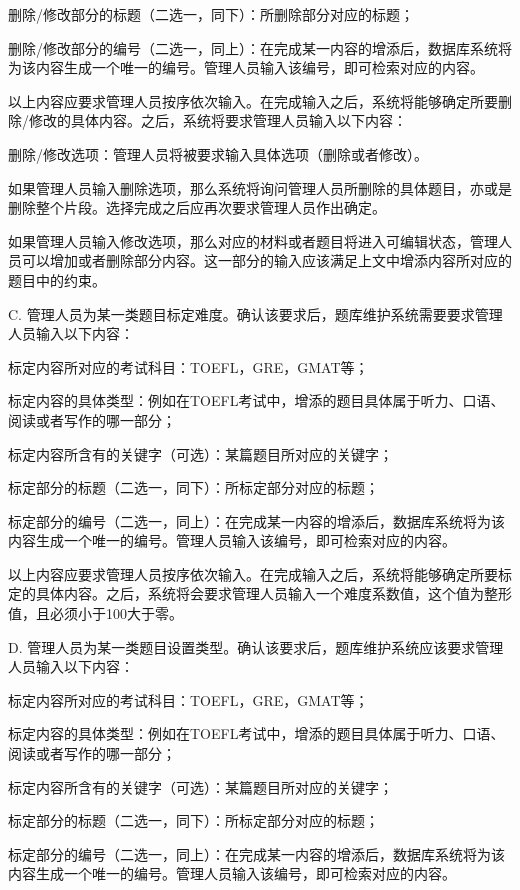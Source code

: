 	删除/修改部分的标题（二选一，同下）：所删除部分对应的标题；

	删除/修改部分的编号（二选一，同上）：在完成某一内容的增添后，数据库系统将为该内容生成一个唯一的编号。管理人员输入该编号，即可检索对应的内容。

以上内容应要求管理人员按序依次输入。在完成输入之后，系统将能够确定所要删除/修改的具体内容。之后，系统将要求管理人员输入以下内容：

	删除/修改选项：管理人员将被要求输入具体选项（删除或者修改）。

	如果管理人员输入删除选项，那么系统将询问管理人员所删除的具体题目，亦或是删除整个片段。选择完成之后应再次要求管理人员作出确定。

	如果管理人员输入修改选项，那么对应的材料或者题目将进入可编辑状态，管理人员可以增加或者删除部分内容。这一部分的输入应该满足上文中增添内容所对应的题目中的约束。

C. 管理人员为某一类题目标定难度。确认该要求后，题库维护系统需要要求管理人员输入以下内容：

	标定内容所对应的考试科目：TOEFL，GRE，GMAT等；

	标定内容的具体类型：例如在TOEFL考试中，增添的题目具体属于听力、口语、阅读或者写作的哪一部分；

	标定内容所含有的关键字（可选）：某篇题目所对应的关键字；

	标定部分的标题（二选一，同下）：所标定部分对应的标题；

	标定部分的编号（二选一，同上）：在完成某一内容的增添后，数据库系统将为该内容生成一个唯一的编号。管理人员输入该编号，即可检索对应的内容。

以上内容应要求管理人员按序依次输入。在完成输入之后，系统将能够确定所要标定的具体内容。之后，系统将会要求管理人员输入一个难度系数值，这个值为整形值，且必须小于100大于零。

D. 管理人员为某一类题目设置类型。确认该要求后，题库维护系统应该要求管理人员输入以下内容：

	标定内容所对应的考试科目：TOEFL，GRE，GMAT等；

	标定内容的具体类型：例如在TOEFL考试中，增添的题目具体属于听力、口语、阅读或者写作的哪一部分；

	标定内容所含有的关键字（可选）：某篇题目所对应的关键字；

	标定部分的标题（二选一，同下）：所标定部分对应的标题；

	标定部分的编号（二选一，同上）：在完成某一内容的增添后，数据库系统将为该内容生成一个唯一的编号。管理人员输入该编号，即可检索对应的内容。

